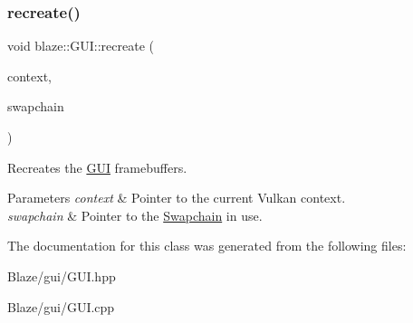 \subsubsection{\texorpdfstring{recreate()}{recreate()}}
{\footnotesize\ttfamily void blaze\+::\+G\+U\+I\+::recreate (\begin{DoxyParamCaption}\item[{const \hyperlink{classblaze_1_1Context}{Context} $\ast$}]{context,  }\item[{const \hyperlink{classblaze_1_1Swapchain}{Swapchain} $\ast$}]{swapchain }\end{DoxyParamCaption})}



Recreates the \hyperlink{classblaze_1_1GUI}{G\+UI} framebuffers. 


\begin{DoxyParams}{Parameters}
{\em context} & Pointer to the current Vulkan context. \\
\hline
{\em swapchain} & Pointer to the \hyperlink{classblaze_1_1Swapchain}{Swapchain} in use. \\
\hline
\end{DoxyParams}


The documentation for this class was generated from the following files\+:\begin{DoxyCompactItemize}
\item 
Blaze/gui/G\+U\+I.\+hpp\item 
Blaze/gui/G\+U\+I.\+cpp\end{DoxyCompactItemize}
